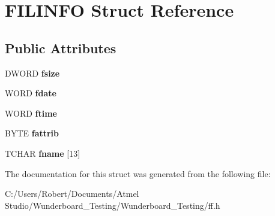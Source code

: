 \hypertarget{struct_f_i_l_i_n_f_o}{\section{F\-I\-L\-I\-N\-F\-O Struct Reference}
\label{struct_f_i_l_i_n_f_o}
}
\subsection*{Public Attributes}
\begin{DoxyCompactItemize}
\item 
\hypertarget{struct_f_i_l_i_n_f_o_aee7441af7dc0c443d1e1e6011cc7dcac}{D\-W\-O\-R\-D {\bfseries fsize}}\label{struct_f_i_l_i_n_f_o_aee7441af7dc0c443d1e1e6011cc7dcac}

\item 
\hypertarget{struct_f_i_l_i_n_f_o_a7c01c48a15b1b49da459924437b0bd52}{W\-O\-R\-D {\bfseries fdate}}\label{struct_f_i_l_i_n_f_o_a7c01c48a15b1b49da459924437b0bd52}

\item 
\hypertarget{struct_f_i_l_i_n_f_o_ae0f751b79621bf7b29669f177bbe6b9a}{W\-O\-R\-D {\bfseries ftime}}\label{struct_f_i_l_i_n_f_o_ae0f751b79621bf7b29669f177bbe6b9a}

\item 
\hypertarget{struct_f_i_l_i_n_f_o_a838d542585831b085537b363f18205c0}{B\-Y\-T\-E {\bfseries fattrib}}\label{struct_f_i_l_i_n_f_o_a838d542585831b085537b363f18205c0}

\item 
\hypertarget{struct_f_i_l_i_n_f_o_abd852510f2f79b4ec773156d8942dc7c}{T\-C\-H\-A\-R {\bfseries fname} \mbox{[}13\mbox{]}}\label{struct_f_i_l_i_n_f_o_abd852510f2f79b4ec773156d8942dc7c}

\end{DoxyCompactItemize}


The documentation for this struct was generated from the following file\-:\begin{DoxyCompactItemize}
\item 
C\-:/\-Users/\-Robert/\-Documents/\-Atmel Studio/\-Wunderboard\-\_\-\-Testing/\-Wunderboard\-\_\-\-Testing/ff.\-h\end{DoxyCompactItemize}
